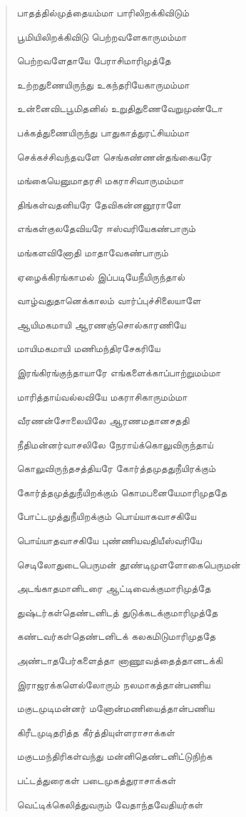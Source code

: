 \documentclass{article}
\begin{document}
\begin{quotation}
{பாதத்தில்முத்தையம்மா பாரிலிறக்கிவிடும்

பூமியிலிறக்கிவிடு பெற்றவளேகாருமம்மா

பெற்றவளேதாயே பேராசிமாரிமுத்தே

உற்றதுணையிருந்து உகந்தரியேகாருமம்மா

உன்னைவிடபூமிதனில் உறுதிதுணைவேறுமுண்டோ

பக்கத்துணையிருந்து பாதுகாத்துரட்சியம்மா

செக்கச்சிவந்தவளே செங்கண்ணன்தங்கையரே

மங்கையெனுமாதரசி மகராசிவாருமம்மா

திங்கள்வதனியரே தேவிகன்னனூராளே

எங்கள்குலதேவியரே ஈஸ்வரியேகண்பாரும்

மங்களவினோதி மாதாவேகண்பாரும்

ஏழைக்கிரங்காமல் இப்படியேநீயிருந்தால்

வாழ்வதுதானெக்காலம் வார்ப்புச்சிலையாளே

ஆயிமகமாயி ஆரணஞ்சொல்காரணியே

மாயிமகமாயி மணிமந்திரசேகரியே

இரங்கிரங்குந்தாயாரே எங்களைக்காப்பாற்றுமம்மா

மாரித்தாய்வல்லவியே மகராசிகாருமம்மா

வீரணன்சோலையிலே ஆரணமதானசததி

நீதிமன்னர்வாசலிலே நேராய்க்கொலுவிருந்தாய்

கொலுவிருந்தசத்தியரே கோர்த்தமுததுநீயிரக்கும்

கோர்த்தமுத்துநீயிறக்கும் கொமபனையேமாரிமுததே

போட்டமுத்துநீயிறக்கும் பொய்யாகவாசகியே

பொய்யாதவாசகியே புண்ணியவதியீஸ்வரியே

செடிலோதுடைபெருமன் தூண்டிமுளளோகைபெருமன்

அடங்காதமானிடரை ஆட்டிவைக்குமாரிமுத்தே

துஷ்டர்கள்தெண்டனிடத் துடுக்கடக்குமாரிமுத்தே

கண்டவர்கள்தெண்டனிடக் கலகமிடுமாரிமுததே

அண்டாதபேர்களைத்தா னாணூவத்தைத்தானடக்கி

இராஜரக்களெல்லோரும் நலமாகத்தான்பணிய

மகுடமுடிமன்னர் மனோன்மணியைத்தான்பணிய

கிரீடமுடிதரித்த கீர்த்தியுள்ளராசாக்கள்

மகுடமந்திரிகள்வந்து மன்னிதெண்டனிட்டுநிற்க

பட்டத்துரைகள் படைமுகத்துராசாக்கள்

வெட்டிக்கெலித்துவரும் வேதாந்தவேதியர்கள்

}
\end{quotation}
\end{document}

